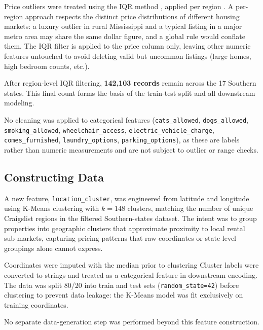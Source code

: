 \noindent
Price outliers were treated using the IQR method%
, applied per region %
. A per-region approach respects the distinct price distributions of different housing markets: a luxury outlier in rural Mississippi and a typical listing in a major metro area may share the same dollar figure, and a global rule would conflate them. The IQR filter is applied to the price column only, leaving other numeric features untouched to avoid deleting valid but uncommon listings (large homes, high bedroom counts, etc.). %

\noindent
After region-level IQR filtering, \textbf{142,103 records} remain across the 17 Southern states. This final count forms the basis of the train-test split and all downstream modeling.

\noindent
No cleaning was applied to categorical features (\texttt{cats\_allowed}, \texttt{dogs\_allowed}, \texttt{smoking\_allowed}, \texttt{wheelchair\_access}, \texttt{electric\_vehicle\_charge}, \texttt{comes\_furnished}, \texttt{laundry\_options}, \texttt{parking\_options}), as these are labels rather than numeric measurements and are not subject to outlier or range checks.


\subsection{Constructing Data}
\label{subsec:Constructing Data}
\noindent
A new feature, \texttt{location\_cluster}, was engineered from latitude and longitude using K-Means clustering with $k = 148$ clusters, matching the number of unique Craigslist regions in the filtered Southern-states dataset. The intent was to group properties into geographic clusters that approximate proximity to local rental sub-markets, capturing pricing patterns that raw coordinates or state-level groupings alone cannot express.

\noindent
Coordinates were imputed with the median prior to clustering %
Cluster labels were converted to strings and treated as a categorical feature in downstream encoding. The data was split 80/20 into train and test sets (\texttt{random\_state=42}) before clustering to prevent data leakage: the K-Means model was fit exclusively on training coordinates.

\noindent
No separate data-generation step was performed beyond this feature construction.


